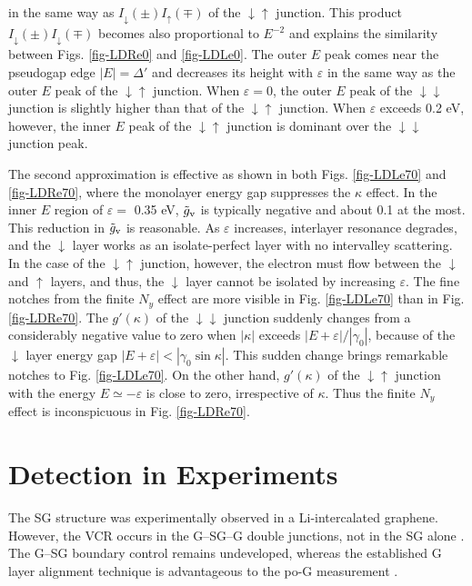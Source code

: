 \documentclass{jpsj3}
\begin{document}
in the same way as $I_\downarrow(\pm)I_\uparrow(\mp)$ of
the $\downarrow\uparrow$ junction.
This product $I_\downarrow(\pm)I_\downarrow(\mp)$ 
becomes also proportional to $E^{-2}$ and 
explains the similarity between Figs. \ref{fig-LDRe0} and \ref{fig-LDLe0}.
The outer $E$ peak comes near the pseudogap edge $|E|=\Delta'$
and decreases its height with $\varepsilon$
in the same way as
the outer $E$ peak of the $\downarrow\uparrow$ junction.
When $\varepsilon=0$, the outer $E$ peak of the $\downarrow\downarrow$ junction is slightly higher than that of the $\downarrow\uparrow$ junction.
When $\varepsilon $ exceeds 0.2 eV, however, the inner $E$ peak of
the $\downarrow\uparrow$ junction is dominant over the
$\downarrow\downarrow$ junction peak.










The second approximation is effective as shown in both  Figs. \ref{fig-LDLe70}
and \ref{fig-LDRe70},
where the monolayer energy gap suppresses the $\kappa$ effect.
In the inner $E$ region of $\varepsilon=$ 0.35 eV, 
$\tilde{g}_{\rm v}$ is typically
negative and about 0.1 at the most.
This reduction in $\tilde{g}_{\rm v}$ is reasonable.
As $\varepsilon$ increases, interlayer resonance
 degrades, and the $\downarrow$ layer works as
an isolate-perfect layer with no intervalley scattering.
In the case of the $\downarrow\uparrow$ junction, however, the electron must flow between the $\downarrow$ and $\uparrow$ layers, and thus,
 the $\downarrow$ layer cannot be 
isolated by increasing $\varepsilon$.
The fine notches from the finite $N_y$ effect are more visible in Fig. \ref{fig-LDLe70} than in Fig. \ref{fig-LDRe70}. 
The $g'(\kappa)$
of the $\downarrow\downarrow$ junction
suddenly changes from a considerably negative
value to zero when $|\kappa|$ exceeds 
$|E+\varepsilon|/|\gamma_0|$,
because of the $\downarrow$ layer energy gap $|E+\varepsilon| < |\gamma_0\sin\kappa|$.
This sudden change brings remarkable notches to Fig. \ref{fig-LDLe70}.
On the other hand,
$g'(\kappa)$ 
of the $\downarrow\uparrow$ junction 
with the energy $E \simeq -\varepsilon$
is close to zero, irrespective of $\kappa$.
Thus the finite $N_y$ effect is inconspicuous in Fig. \ref{fig-LDRe70}.






\section{Detection in Experiments}
The SG structure was experimentally observed in a Li-intercalated graphene\cite{(13)}. 
However, the VCR occurs in the G--SG--G double junctions, not in the SG alone \cite{graphene-precession,graphene-precession2,graphene-precession3}. 
The G--SG boundary control remains undeveloped, whereas the established G layer alignment technique is advantageous to the po-G measurement \cite{(12)}.
\end{document}

